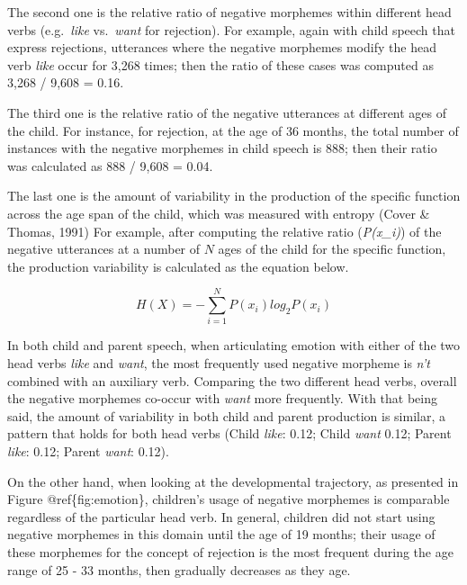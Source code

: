 \documentclass[10pt, letterpaper]{article}
\begin{document}
The second one is the relative ratio of negative morphemes within
different head verbs (e.g.~\emph{like} vs.~\emph{want} for rejection).
For example, again with child speech that express rejections, utterances
where the negative morphemes modify the head verb \emph{like} occur for
3,268 times; then the ratio of these cases was computed as 3,268 / 9,608
= 0.16.

The third one is the relative ratio of the negative utterances at
different ages of the child. For instance, for rejection, at the age of
36 months, the total number of instances with the negative morphemes in
child speech is 888; then their ratio was calculated as 888 / 9,608 =
0.04.

The last one is the amount of variability in the production of the
specific function across the age span of the child, which was measured
with entropy (Cover \& Thomas, 1991) For example, after computing the
relative ratio (\emph{P(x\_i)}) of the negative utterances at a number
of \(N\) ages of the child for the specific function, the production
variability is calculated as the equation below.

\[
H(X) = -\sum_{i=1}^N P(x_i)log_2P(x_i)               
\]

In both child and parent speech, when articulating emotion with either
of the two head verbs \emph{like} and \emph{want}, the most frequently
used negative morpheme is \emph{n't} combined with an auxiliary verb.
Comparing the two different head verbs, overall the negative morphemes
co-occur with \emph{want} more frequently. With that being said, the
amount of variability in both child and parent production is similar, a
pattern that holds for both head verbs (Child \emph{like}: 0.12; Child
\emph{want} 0.12; Parent \emph{like}: 0.12; Parent \emph{want}: 0.12).

On the other hand, when looking at the developmental trajectory, as
presented in Figure @ref\{fig:emotion\}, children's usage of negative
morphemes is comparable regardless of the particular head verb. In
general, children did not start using negative morphemes in this domain
until the age of 19 months; their usage of these morphemes for the
concept of rejection is the most frequent during the age range of 25 -
33 months, then gradually decreases as they age.
\end{document}
